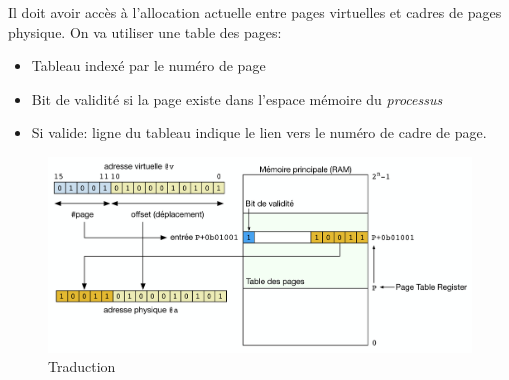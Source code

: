 Il doit avoir accès à l'allocation actuelle entre pages virtuelles et
cadres de pages physique. On va utiliser une table des pages:

\begin{itemize}
\tightlist
\item
  Tableau indexé par le numéro de page
\item
  Bit de validité si la page existe dans l'espace mémoire du
  \emph{processus}
\item
  Si valide: ligne du tableau indique le lien vers le numéro de cadre de
  page.
\end{itemize}

\begin{figure}
\centering
\includegraphics{image-54.png}
\caption{Traduction}
\end{figure}
